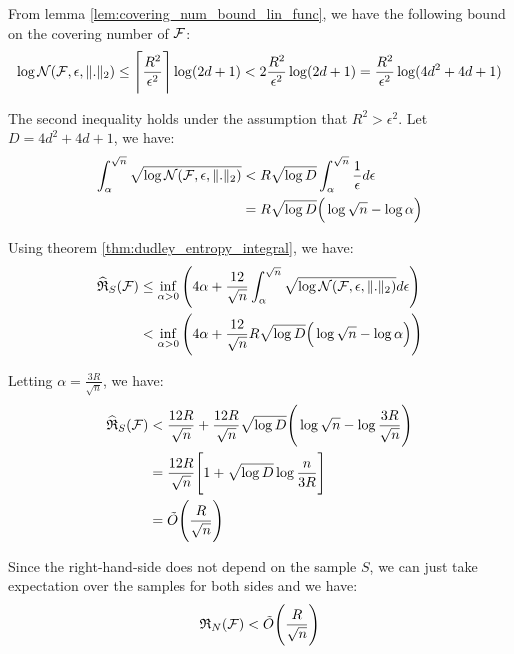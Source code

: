 \begin{proof*}
    \noindent From lemma \ref{lem:covering_num_bound_lin_func}, we have the following bound on the covering number of $\mathcal{F}$:
    \begin{align*}
        \log\mathcal{N}(\mathcal{F}, \epsilon, \|.\|_2) \le \Bigg\lceil \frac{R^2}{\epsilon^2} \Bigg\rceil \log(2d+1) < 2\frac{R^2}{\epsilon^2}\log(2d+1) = \frac{R^2}{\epsilon^2}\log(4d^2 + 4d + 1)
    \end{align*}

    \noindent The second inequality holds under the assumption that $R^2 > \epsilon^2$. Let $D = 4d^2 + 4d + 1$, we have:
    \begin{align*}
        \int_\alpha^{\sqrt n} \sqrt{\log\mathcal{N}(\mathcal{F}, \epsilon, \|.\|_2)} 
            &< R\sqrt{\log D}\int_\alpha^{\sqrt n} \frac{1}{\epsilon}d\epsilon \\
            &= R\sqrt{\log D}\Big(  \log\sqrt{n} - \log\alpha  \Big)
    \end{align*}

    \noindent Using theorem \ref{thm:dudley_entropy_integral}, we have:
    \begin{align*}
        \widehat{\mathfrak{R}}_S(\mathcal{F}) 
            &\le \inf_{\alpha>0}\Bigg( 
                4\alpha + \frac{12}{\sqrt n} \int_\alpha^{\sqrt n} \sqrt{\log\mathcal{N}(\mathcal{F}, \epsilon, \|.\|_2)} d\epsilon
             \Bigg) \\
            &< \inf_{\alpha>0}\Bigg( 
                4\alpha + \frac{12}{\sqrt n} R\sqrt{\log D} \Big(  \log\sqrt{n} - \log\alpha  \Big)
             \Bigg)
    \end{align*}

    \noindent Letting $\alpha=\frac{3R}{\sqrt n}$, we have:
    \begin{align*}
        \widehat{\mathfrak{R}}_S(\mathcal{F}) &< \frac{12R}{\sqrt n} + \frac{12R}{\sqrt n}\sqrt{\log D} \Bigg(  \log \sqrt{n} - \log\frac{3R}{\sqrt n}  \Bigg) \\
        &= \frac{12R}{\sqrt n} \Bigg[ 
            1 + \sqrt{\log D}\log\frac{n}{3R}
         \Bigg] \\
        &= \tilde O\Bigg(  \frac{R}{\sqrt n}  \Bigg)
    \end{align*}

    \noindent Since the right-hand-side does not depend on the sample $S$, we can just take expectation over the samples for both sides and we have:
    \begin{align*}
        \mathfrak{R}_N(\mathcal{F}) < \tilde O\Bigg(  \frac{R}{\sqrt n}  \Bigg)
    \end{align*}
\end{proof*}

